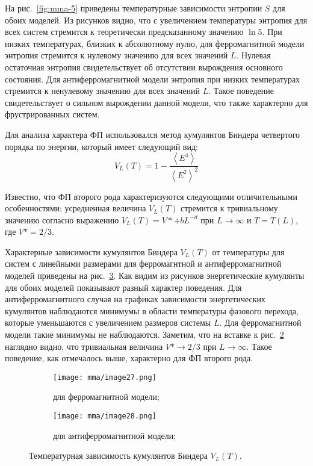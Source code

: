 На рис.~\ref{fig:mma-5} приведены температурные зависимости энтропии $S$ для обоих моделей. Из рисунков видно, что с увеличением температуры энтропия для всех систем стремится к теоретически предсказанному значению $\ln 5$. При низких температурах, близких к абсолютному нулю, для ферромагнитной модели энтропия стремится к нулевому значению для всех значений $L$. Нулевая остаточная энтропия свидетельствует об отсутствии вырождения основного состояния. Для антиферромагнитной модели энтропия при низких температурах стремится к ненулевому значению для всех значений $L$. Такое поведение свидетельствует о сильном вырождении данной модели, что также характерно для фрустрированных систем.

Для анализа характера ФП использовался метод кумулянтов Биндера четвертого порядка по энергии, который имеет следующий вид:
\begin{equation*}
    V_L (T) = 1 - \frac{\left<E^4\right>}{\left<E^2\right>^2}
\end{equation*}

Известно, что ФП второго рода характеризуются следующими отличительными особенностями: усредненная величина $V_L (T)$ стремится к тривиальному значению согласно выражению $V_L (T) = V* + b L^{-d}$ при $L \to \infty$ и $T = T(L)$, где $V* = 2/3$.

Характерные зависимости кумулянтов Биндера $V_L(T)$ от температуры для систем с линейными размерами для ферромагнтной и антиферромагнитной моделей приведены на рис.~\ref{fig:mma-6}. Как видим из рисунков энергетические кумулянты для обоих моделей показывают разный характер поведения. Для антиферромагнитного случая на графиках зависимости энергетических кумулянтов наблюдаются минимумы в области температуры фазового перехода, которые уменьшаются с увеличением размеров системы $L$. Для ферромагнитной модели такие минимумы не наблюдаются. Заметим, что на вставке к рис.~\ref{fig:mma-6b} наглядно видно, что тривиальная величина $V* \to 2/3$ при $L \to \infty$. Такое поведение, как отмечалось выше, характерно для ФП второго рода.
\begin{figure}[ht]
    \begin{subfigure}{0.5\textwidth}
        \texttt{[image: mma/image27.png]}
        \caption{для ферромагнитной модели;}
        \label{fig:mma-6a}
    \end{subfigure}
    \begin{subfigure}{0.5\textwidth}
        \texttt{[image: mma/image28.png]}
        \caption{для антиферромагнитной модели;}
        \label{fig:mma-6b}
    \end{subfigure}
    \caption{Температурная зависимость кумулянтов Биндера $V_L (T)$.}
    \label{fig:mma-6}
\end{figure}

